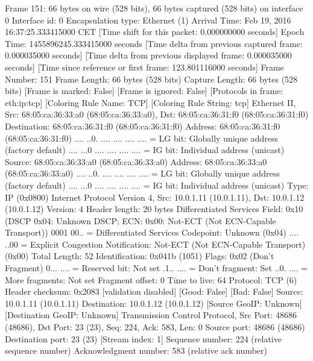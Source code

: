Frame 151: 66 bytes on wire (528 bits), 66 bytes captured (528 bits) on interface 0
    Interface id: 0
    Encapsulation type: Ethernet (1)
    Arrival Time: Feb 19, 2016 16:37:25.333415000 CET
    [Time shift for this packet: 0.000000000 seconds]
    Epoch Time: 1455896245.333415000 seconds
    [Time delta from previous captured frame: 0.000035000 seconds]
    [Time delta from previous displayed frame: 0.000035000 seconds]
    [Time since reference or first frame: 123.801116000 seconds]
    Frame Number: 151
    Frame Length: 66 bytes (528 bits)
    Capture Length: 66 bytes (528 bits)
    [Frame is marked: False]
    [Frame is ignored: False]
    [Protocols in frame: eth:ip:tcp]
    [Coloring Rule Name: TCP]
    [Coloring Rule String: tcp]
Ethernet II, Src: 68:05:ca:36:33:a0 (68:05:ca:36:33:a0), Dst: 68:05:ca:36:31:f0 (68:05:ca:36:31:f0)
    Destination: 68:05:ca:36:31:f0 (68:05:ca:36:31:f0)
        Address: 68:05:ca:36:31:f0 (68:05:ca:36:31:f0)
        .... ..0. .... .... .... .... = LG bit: Globally unique address (factory default)
        .... ...0 .... .... .... .... = IG bit: Individual address (unicast)
    Source: 68:05:ca:36:33:a0 (68:05:ca:36:33:a0)
        Address: 68:05:ca:36:33:a0 (68:05:ca:36:33:a0)
        .... ..0. .... .... .... .... = LG bit: Globally unique address (factory default)
        .... ...0 .... .... .... .... = IG bit: Individual address (unicast)
    Type: IP (0x0800)
Internet Protocol Version 4, Src: 10.0.1.11 (10.0.1.11), Dst: 10.0.1.12 (10.0.1.12)
    Version: 4
    Header length: 20 bytes
    Differentiated Services Field: 0x10 (DSCP 0x04: Unknown DSCP; ECN: 0x00: Not-ECT (Not ECN-Capable Transport))
        0001 00.. = Differentiated Services Codepoint: Unknown (0x04)
        .... ..00 = Explicit Congestion Notification: Not-ECT (Not ECN-Capable Transport) (0x00)
    Total Length: 52
    Identification: 0x041b (1051)
    Flags: 0x02 (Don't Fragment)
        0... .... = Reserved bit: Not set
        .1.. .... = Don't fragment: Set
        ..0. .... = More fragments: Not set
    Fragment offset: 0
    Time to live: 64
    Protocol: TCP (6)
    Header checksum: 0x2083 [validation disabled]
        [Good: False]
        [Bad: False]
    Source: 10.0.1.11 (10.0.1.11)
    Destination: 10.0.1.12 (10.0.1.12)
    [Source GeoIP: Unknown]
    [Destination GeoIP: Unknown]
Transmission Control Protocol, Src Port: 48686 (48686), Dst Port: 23 (23), Seq: 224, Ack: 583, Len: 0
    Source port: 48686 (48686)
    Destination port: 23 (23)
    [Stream index: 1]
    Sequence number: 224    (relative sequence number)
    Acknowledgment number: 583    (relative ack number)
